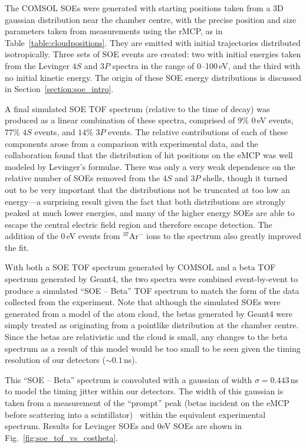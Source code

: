 The COMSOL SOEs were generated with starting positions taken from a 3D gaussian distribution near the chamber centre, with the precise position and size parameters taken from measurements using the rMCP, as in Table~\ref{table:cloudpositions}.  They are emitted with initial trajectories distributed isotropically.  Three sets of SOE events are created: two with initial energies taken from the Levinger $4S$ and $3P$ spectra in the range of 0--100\,eV, and the third with no initial kinetic energy.  The origin of these SOE energy distributions is discussed in Section~\ref{section:soe_intro}.

A final simulated SOE TOF spectrum (relative to the time of decay) was produced as a linear combination of these spectra, comprised of $9\%$ 0\,eV events, $77\%$ $4S$ events, and $14\%$ $3P$ events.  The relative contributions of each of these components arose from a comparison with experimental data, and the collaboration found that the distribution of hit positions on the eMCP was well modeled by Levinger's formulae. There was only a very weak dependence on the relative number of SOEs removed from the $4S$ and $3P$ shells, though it turned out to be very important that the distributions not be truncated at too low an energy---a surprising result given the fact that both distributions are strongly peaked at much lower energies, and many of the higher energy SOEs are able to escape the central electric field region and therefore escape detection.     The addition of the 0\,eV events from $^{37}$Ar$^{-}$ ions to the spectrum also greatly improved the fit.


With both a SOE TOF spectrum generated by COMSOL and a beta TOF spectrum generated by Geant4, the two spectra were combined event-by-event to produce a simulated ``SOE -- Beta'' TOF spectrum to match the form of the data collected from the experiment. Note that although the simulated SOEs were generated from a model of the atom cloud, the betas generated by Geant4 were simply treated as originating from a pointlike distribution at the chamber centre.  Since the betas are relativistic and the cloud is small, any changes to the beta spectrum as a result of this model would be too small to be seen given the timing resolution of our detectors ($\sim 0.1\,$ns).  

This ``SOE -- Beta'' spectrum is convoluted with a gaussian of width $\sigma=0.443\,$ns to model the timing jitter within our detectors.  The width of this gaussian is taken from a measurement of the ``prompt'' peak (betas incident on the eMCP before scattering into a scintillator)~ within the equivalent experimental spectrum.  Results for Levinger SOEs and 0eV SOEs are shown in Fig.~\ref{fig:soe_tof_vs_costheta}.



